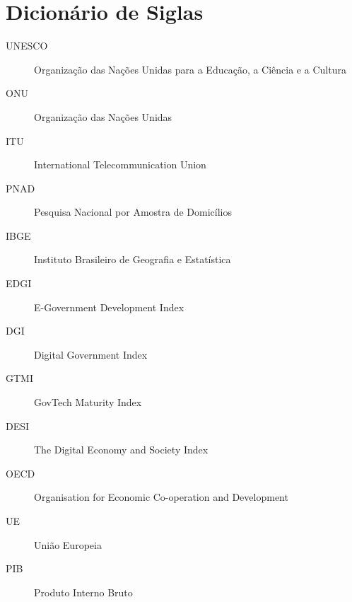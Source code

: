 \section*{Dicionário de Siglas}

\begin{description}
    \item[UNESCO] Organização das Nações Unidas para a Educação, a Ciência e a Cultura
    \item[ONU] Organização das Nações Unidas
    \item[ITU] International Telecommunication Union
    \item[PNAD] Pesquisa Nacional por Amostra de Domicílios
    \item[IBGE] Instituto Brasileiro de Geografia e Estatística
    \item[EDGI] E-Government Development Index
    \item[DGI] Digital Government Index  
    \item[GTMI] GovTech Maturity Index
    \item[DESI] The Digital Economy and Society Index 
    \item[OECD] Organisation for Economic Co-operation and Development
    \item[UE] União Europeia 
    \item[PIB] Produto Interno Bruto 
\end{description}